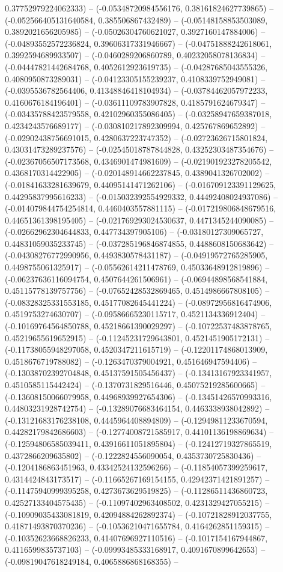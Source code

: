 0.37752979224062333) -- (-0.05348720984556176, 0.38161824627739865) -- (-0.052566405131640584, 0.385506867432489) -- (-0.05148158853503089, 0.3892021656205985) -- (-0.05026304760621027, 0.3927160147884006) -- (-0.04893552572236824, 0.39606317331946667) -- (-0.04751888242618061, 0.3992594689933507) -- (-0.0460289206860789, 0.40232058078136834) -- (-0.04447821442684768, 0.4052612923619735) -- (-0.04287685043555326, 0.4080950873289031) -- (-0.04123305155239237, 0.4108339752949081) -- (-0.0395536782564406, 0.41348846418104934) -- (-0.03784462057972233, 0.4160676184196401) -- (-0.03611109783907828, 0.4185791624679347) -- (-0.03435788423579558, 0.42102960355086405) -- (-0.03258947659387018, 0.4234243576689177) -- (-0.030810217892309994, 0.425767869652892) -- (-0.02902438756691015, 0.4280637223747352) -- (-0.02723626715801824, 0.43031473289237576) -- (-0.02545018787844828, 0.43252303487354676) -- (-0.02367056507173568, 0.4346901474981609) -- (-0.021901923278205542, 0.4368170314422905) -- (-0.020148914662237845, 0.4389041326702002) -- (-0.01841633281639679, 0.44095141471262106) -- (-0.016709123391129625, 0.44295837995616233) -- (-0.015032392554929332, 0.44492408024937086) -- (-0.014079844754254814, 0.4460403557881115) -- (-0.017219806848679516, 0.44651361398195405) -- (-0.021769293024530637, 0.4471345244090085) -- (-0.02662962304644833, 0.447734397905106) -- (-0.03180127309065727, 0.44831059035233745) -- (-0.037285196846874855, 0.4488608150683642) -- (-0.04308276772990956, 0.4493830578431187) -- (-0.04919572765285905, 0.4498755061325917) -- (-0.05562614211478769, 0.45033648912819896) -- (-0.06237636116094754, 0.4507644261506961) -- (-0.06944898568541884, 0.45115778139757756) -- (-0.07652428532869465, 0.4514986667808105) -- (-0.08328325331553185, 0.45177082645441224) -- (-0.08972956816474906, 0.4519753274630707) -- (-0.09586665230115717, 0.4521134336912404) -- (-0.10169764564850788, 0.45218661390029297) -- (-0.10722537483878765, 0.45219655619652915) -- (-0.11245231729643801, 0.4521451905172131) -- (-0.11738055948297058, 0.4520347211615719) -- (-0.12201174868013909, 0.4518676719788082) -- (-0.1263470379004921, 0.451646947594406) -- (-0.13038702392704848, 0.45137591505456437) -- (-0.13413167923341957, 0.4510585115442424) -- (-0.1370731829516446, 0.45075219285600665) -- (-0.13608150066079958, 0.44968939927654306) -- (-0.13451426570993316, 0.44803231928742754) -- (-0.13289076683464154, 0.4463338938042892) -- (-0.13121683176238108, 0.4445964408894809) -- (-0.12949811233670594, 0.44282179842686603) -- (-0.12774008721585917, 0.44101136198869634) -- (-0.12594806585039411, 0.43916611051895804) -- (-0.12412719327865519, 0.4372866209635802) -- (-0.1222824556090054, 0.4353730725830436) -- (-0.1204186863451963, 0.43342524132596266) -- (-0.11854057399259617, 0.4314424843173517) -- (-0.11665267169154155, 0.42942371421891257) -- (-0.11475940999395258, 0.4273673629519825) -- (-0.11286511436860723, 0.42527133404575435) -- (-0.11097402963408502, 0.4231329427055215) -- (-0.10909035433081819, 0.42094884262892374) -- (-0.10721828912037755, 0.41871493870370236) -- (-0.10536210471655784, 0.4164262851159315) -- (-0.10352623668826233, 0.41407696927110516) -- (-0.1017154167944867, 0.4116599835737103) -- (-0.09993485333168917, 0.4091670899642653) -- (-0.09819047618249184, 0.4065886868168355) -- 